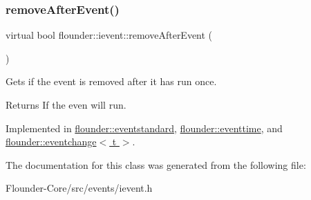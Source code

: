 \subsubsection{\texorpdfstring{remove\+After\+Event()}{removeAfterEvent()}}
{\footnotesize\ttfamily virtual bool flounder\+::ievent\+::remove\+After\+Event (\begin{DoxyParamCaption}{ }\end{DoxyParamCaption})\hspace{0.3cm}{\ttfamily [pure virtual]}}



Gets if the event is removed after it has run once. 

\begin{DoxyReturn}{Returns}
If the even will run. 
\end{DoxyReturn}


Implemented in \hyperlink{classflounder_1_1eventstandard_ac4b9d57605f7f81c7c7e1cb981002f2f}{flounder\+::eventstandard}, \hyperlink{classflounder_1_1eventtime_ad765cd1e3b8fe2bf95f2290f5c625af1}{flounder\+::eventtime}, and \hyperlink{classflounder_1_1eventchange_ab3d476ecb51140e93886dc320ee44c33}{flounder\+::eventchange$<$ t $>$}.



The documentation for this class was generated from the following file\+:\begin{DoxyCompactItemize}
\item 
Flounder-\/\+Core/src/events/ievent.\+h\end{DoxyCompactItemize}
